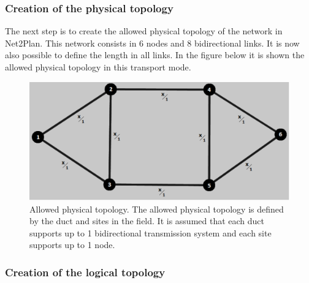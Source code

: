 \newpage
\subsubsection{Creation of the physical topology}

\vspace{11pt}
The next step is to create the allowed physical topology of the network in Net2Plan. This network consists in 6 nodes and 8 bidirectional links. It is now also possible to define the length in all links. In the figure below it is shown the allowed physical topology in this transport mode.

\begin{figure}[H]
\centering
\includegraphics[width=12cm]{sdf/heuristic/translucent_protection/figures/allowed_physical}
\caption{Allowed physical topology. The allowed physical topology is defined by the duct and sites in the field. It is assumed that each duct supports up to 1 bidirectional transmission system and each site supports up to 1 node.}
\label{allowed_physical_protec_transl}
\end{figure}

\subsubsection{Creation of the logical topology}

